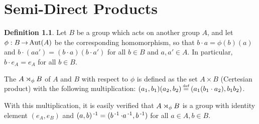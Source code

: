 \documentclass[11pt]{book}
\theoremstyle{definition}   \newtheorem{defn}[counter]{Definition} %
\newcommand\myeq{\mathrel{\overset{\makebox[0pt]{\mbox{\normalfont\tiny\sffamily \textrm{def}}}}{=}}}
\newcommand{\hm}{homomorphism}   \newcommand{\hms}{homomorphisms}   \newcommand{\iso}{isomorphism}
\DeclareMathOperator{\ra}{\rightarrow}   \DeclareMathOperator{\Poly}{\mathbf{P}}   \DeclareMathOperator{\spn}{\textnormal{span}}   \DeclareMathOperator{\aut}{\textnormal{Aut}}
\newcommand{\vs}{\vspace{8pt}}
\numberwithin{counter}{chapter}
\begin{document}
\chapter{Semi-Direct Products}

\begin{defn}
Let $B$ be a group which acts on another group $A$, and let $\phi : B \ra \aut(A)$ be the corresponding \hm, so that $b \cdot a = \phi(b)(a)$ and $b\cdot(aa') = (b\cdot a)(b\cdot a')$ for all $b\in B$ and $a,a' \in A$. In particular, $b\cdot e_A = e_A$ for all $b \in B$.

The  $A \rtimes_{\phi} B$ of $A$ and $B$ with respect to $\phi$ is defined as the set $A \times B$ (Certesian product) with the following multiplication: $(a_1,b_1)(a_2,b_2) \myeq (a_1 (b_1\cdot a_2), b_1 b_2)$.

With this multiplication, it is easily verified that $A \rtimes_{\phi} B$ is a group with identity element $(e_A,e_B)$ and $(a,b)\operatorname{^{-1}} = (b\operatorname{^{-1}} \cdot a\operatorname{^{-1}},b\operatorname{^{-1}})$ for all $a\in A, b \in B$.
\end{defn}

\vs
\end{document}
